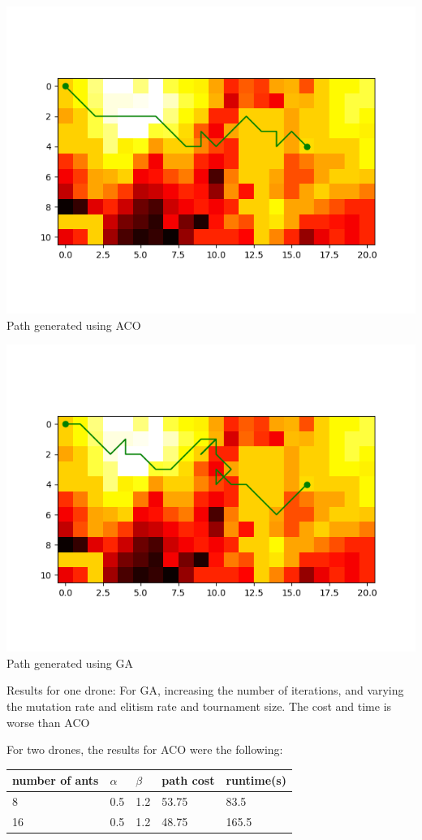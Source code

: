 \documentclass[conference]{IEEEtran}
\begin{document}
\includegraphics[scale=0.5]{performance/aco_1_drone}
Path generated using ACO

\includegraphics[scale=0.5]{performance/ga_1_drone}
Path generated using GA

Results for one drone: For GA, increasing the number of iterations, and varying the mutation rate and elitism rate and tournament size. The cost and time is worse than ACO

For two drones, the results for ACO were the following:
\begin{center}
\begin{tabular}{ | m{1cm} | m{1cm}| m{1cm} | m{1.5cm} | m{1.5cm} |} 
\hline
number of ants & $\alpha$ & $\beta$ & path cost & runtime(s) \\ 
\hline
8 & 0.5 & 1.2 & 53.75 & 83.5 \\ 
\hline
16 & 0.5 & 1.2 & 48.75 & 165.5 \\ 
\hline
\end{tabular}
\end{center}
\end{document}
